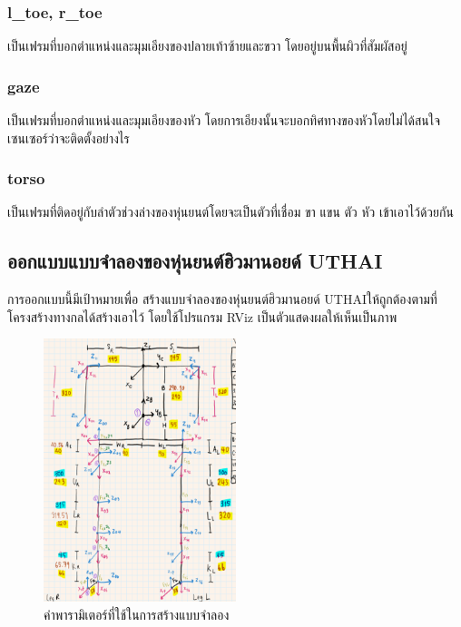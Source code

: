 \subsubsection*{l\_toe, r\_toe}
เป็นเฟรมที่บอกตำแหน่งและมุมเอียงของปลายเท้าซ้ายและขวา โดยอยู่บนพื้นผิวที่สัมผัสอยู่

\subsubsection*{gaze}
เป็นเฟรมที่บอกตำแหน่งและมุมเอียงของหัว โดยการเอียงนั้นจะบอกทิศทางของหัวโดยไม่ได้สนใจเซนเซอร์ว่าจะติดตั้งอย่างไร

\subsubsection*{torso}
เป็นเฟรมที่ติดอยู่กับลำตัวช่วงล่างของหุ่นยนต์โดยจะเป็นตัวที่เชื่อม ขา แขน ตัว หัว เข้าเอาไว้ด้วยกัน


\clearpage
\subsection{ออกแบบแบบจำลองของหุ่นยนต์ฮิวมานอยด์ UTHAI}
การออกแบบนี้มีเป้าหมายเพื่อ สร้างแบบจำลองของหุ่นยนต์ฮิวมานอยด์ UTHAIให้ถูกต้องตามที่โครงสร้างทางกลได้สร้างเอาไว้
โดยใช้โปรแกรม RViz เป็นตัวแสดงผลให้เห็นเป็นภาพ
\begin{figure}[!ht]
	\centering
	\includegraphics[width=0.5\textwidth]{chapter3/images/uthai_sk.png}
	\caption{ค่าพารามิเตอร์ที่ใช้ในการสร้างแบบจำลอง}
\end{figure}



